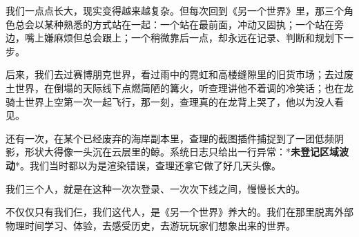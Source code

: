 我们一点点长大，现实变得越来越复杂。但每次回到《另一个世界》里，那三个角色总会以某种熟悉的方式站在一起：一个站在最前面，冲动又固执；一个站在旁边，嘴上嫌麻烦但总会跟上；一个稍微靠后一点，却永远在记录、判断和规划下一步。

后来，我们去过赛博朋克世界，看过雨中的霓虹和高楼缝隙里的旧货市场；去过废土世界，在倒塌的天际线下点燃简陋的篝火，听查理讲他不着调的冷笑话；也在龙骑士世界上空第一次一起飞行，那一刻，查理真的在龙背上哭了，他以为没人看见。

还有一次，在某个已经废弃的海岸副本里，查理的截图插件捕捉到了一团低频阴影，形状大得像一头沉在云层里的鲸。系统日志只给出一行异常：*\textbf{未登记区域波动}*。我们当时都以为是渲染错误，查理还拿它做了好几天头像。

我们三个人，就是在这种一次次登录、一次次下线之间，慢慢长大的。

不仅仅只有我们仨，我们这代人，是《另一个世界》养大的。我们在那里脱离外部物理时间学习、体验，去感受历史，去游玩玩家们想象出来的世界。
